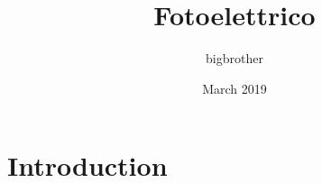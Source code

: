 \documentclass{article}
\title{Fotoelettrico}
\author{bigbrother }
\date{March 2019}
\begin{document}
\maketitle

\section{Introduction}
\end{document}
